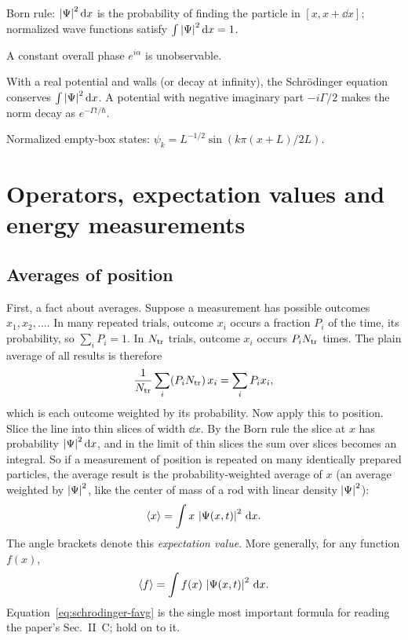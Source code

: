 \begin{keyideas}
\item Born rule: $\left\lvert \Psi\right\rvert^2\mathrm{d} x$ is the probability of finding the particle in $[x,x+\dd x]$; normalized wave functions satisfy $\int\left\lvert \Psi\right\rvert^2\mathrm{d} x=1$.
\item A constant overall phase $e^{i\alpha}$ is unobservable.
\item With a real potential and walls (or decay at infinity), the Schr\"odinger equation conserves $\int\left\lvert \Psi\right\rvert^2\mathrm{d} x$. A potential with negative imaginary part $-i\Gamma/2$ makes the norm decay as $e^{-\Gamma t/\hbar}$.
\item Normalized empty-box states: $\psi_k=L^{-1/2}\sin(k\pi(x+L)/2L)$.
\end{keyideas}

\section{Operators, expectation values and energy measurements}\label{sec:schrodinger-expectation}

\subsection{Averages of position}

First, a fact about averages. Suppose a measurement has possible outcomes $x_1,x_2,\dots$. In many repeated trials, outcome $x_i$ occurs a fraction $P_i$ of the time, its probability, so $\sum_iP_i=1$. In $N_{\rm tr}$ trials, outcome $x_i$ occurs $P_iN_{\rm tr}$ times. The plain average of all results is therefore
\[
\frac{1}{N_{\rm tr}}\sum_i(P_iN_{\rm tr})\,x_i=\sum_iP_ix_i,
\]
which is each outcome weighted by its probability. Now apply this to position. Slice the line into thin slices of width $\dd x$. By the Born rule the slice at $x$ has probability $\left\lvert \Psi\right\rvert^2\mathrm{d} x$, and in the limit of thin slices the sum over slices becomes an integral. So if a measurement of position is repeated on many identically prepared particles, the average result is the probability-weighted average of $x$ (an average weighted by $\left\lvert \Psi\right\rvert^2$, like the center of mass of a rod with linear density $\left\lvert \Psi\right\rvert^2$):
\begin{equation}
\langle x\rangle=\int x\,\left\lvert \Psi(x,t)\right\rvert^2\,\mathrm{d} x.
\label{eq:schrodinger-xavg}
\end{equation}
The angle brackets denote this \emph{expectation value}. More generally, for any function $f(x)$,
\begin{equation}
\langle f\rangle=\int f(x)\,\left\lvert \Psi(x,t)\right\rvert^2\,\mathrm{d} x.
\label{eq:schrodinger-favg}
\end{equation}
Equation~\eqref{eq:schrodinger-favg} is the single most important formula for reading the paper's Sec.~II~C; hold on to it.

